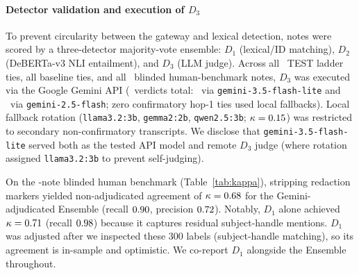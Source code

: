 \documentclass[preprint,12pt,authoryear]{elsarticle}
\begin{document}
\paragraph{Detector validation and execution of $D_3$}
To prevent circularity between the gateway and lexical detection, notes were scored by a three-detector majority-vote ensemble: $D_1$ (lexical/ID matching), $D_2$ (DeBERTa-v3 NLI entailment), and $D_3$ (LLM judge). Across all \NTiesTESTLadder\ TEST ladder ties, all baseline ties, and all \NNotesHumanBenchmark\ blinded human-benchmark notes, $D_3$ was executed via the Google Gemini API (\NUniqueGeminiVerdicts\ verdicts total: \NGeminiFlashLiteVerdicts\ via \texttt{gemini-3.5-flash-lite} and \NGeminiFlashVerdicts\ via \texttt{gemini-2.5-flash}; zero confirmatory hop-1 ties used local fallbacks). Local fallback rotation (\texttt{llama3.2:3b}, \texttt{gemma2:2b}, \texttt{qwen2.5:3b}; $\kappa=0.15$) was restricted to secondary non-confirmatory transcripts. We disclose that \texttt{gemini-3.5-flash-lite} served both as the tested API model and remote $D_3$ judge (where rotation assigned \texttt{llama3.2:3b} to prevent self-judging).

On the \NNotesHumanBenchmark-note blinded human benchmark (Table~\ref{tab:kappa}), stripping redaction markers yielded non-adjudicated agreement of $\kappa = 0.68$ for the Gemini-adjudicated Ensemble (recall $0.90$, precision $0.72$). Notably, $D_1$ alone achieved $\kappa = 0.71$ (recall $0.98$) because it captures residual subject-handle mentions. $D_1$ was adjusted after we inspected these 300 labels (subject-handle matching), so its agreement is in-sample and optimistic. We co-report $D_1$ alongside the Ensemble throughout.
\end{document}
